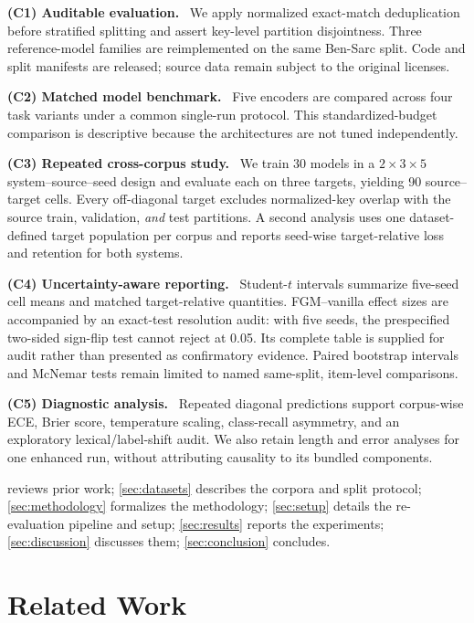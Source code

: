 \documentclass{ieeeaccess}
\newcommand{\runin}[1]{\smallskip\noindent\textbf{#1}\ }
\begin{document}
\runin{(C1) Auditable evaluation.} We apply normalized exact-match deduplication before stratified splitting and assert key-level partition disjointness. Three reference-model families are reimplemented on the same Ben-Sarc split. Code and split manifests are released; source data remain subject to the original licenses.

\runin{(C2) Matched model benchmark.} Five encoders are compared across four task variants under a common single-run protocol. This standardized-budget comparison is descriptive because the architectures are not tuned independently.

\runin{(C3) Repeated cross-corpus study.} We train 30 models in a $2\!\times\!3\!\times\!5$ system--source--seed design and evaluate each on three targets, yielding 90 source--target cells. Every off-diagonal target excludes normalized-key overlap with the source train, validation, \emph{and} test partitions. A second analysis uses one dataset-defined target population per corpus and reports seed-wise target-relative loss and retention for both systems.

\runin{(C4) Uncertainty-aware reporting.} Student-$t$ intervals summarize five-seed cell means and matched target-relative quantities. FGM--vanilla effect sizes are accompanied by an exact-test resolution audit: with five seeds, the prespecified two-sided sign-flip test cannot reject at 0.05. Its complete table is supplied for audit rather than presented as confirmatory evidence. Paired bootstrap intervals and McNemar tests remain limited to named same-split, item-level comparisons.

\runin{(C5) Diagnostic analysis.} Repeated diagonal predictions support corpus-wise ECE, Brier score, temperature scaling, class-recall asymmetry, and an exploratory lexical/label-shift audit. We also retain length and error analyses for one enhanced run, without attributing causality to its bundled components.

 reviews prior work; \cref{sec:datasets} describes the corpora and split protocol; \cref{sec:methodology} formalizes the methodology; \cref{sec:setup} details the re-evaluation pipeline and setup; \cref{sec:results} reports the experiments; \cref{sec:discussion} discusses them; \cref{sec:conclusion} concludes.

\section{Related Work}
\label{sec:related-work}
\end{document}
